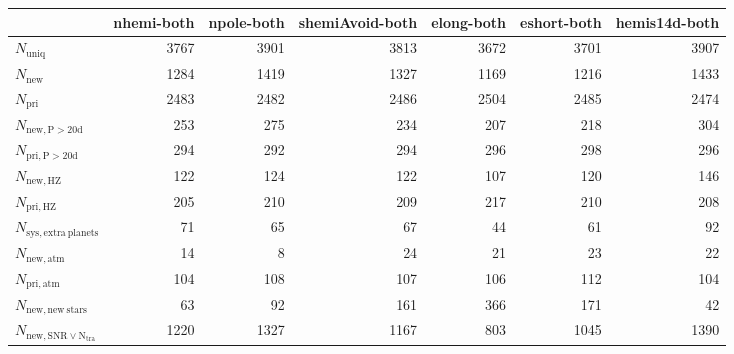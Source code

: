 \begin{tabular}{lrrrrrr}
\toprule
{} &  nhemi-both &  npole-both &  shemiAvoid-both &  elong-both &  eshort-both &  hemis14d-both \\
\midrule
$N_{\mathrm{uniq}}$                &        3767 &        3901 &             3813 &        3672 &         3701 &           3907 \\
$N_{\mathrm{new}}$                 &        1284 &        1419 &             1327 &        1169 &         1216 &           1433 \\
$N_{\mathrm{pri}}$                 &        2483 &        2482 &             2486 &        2504 &         2485 &           2474 \\
$N_{\mathrm{new,P>20d}}$           &         253 &         275 &              234 &         207 &          218 &            304 \\
$N_{\mathrm{pri,P>20d}}$           &         294 &         292 &              294 &         296 &          298 &            296 \\
$N_{\mathrm{new,HZ}}$              &         122 &         124 &              122 &         107 &          120 &            146 \\
$N_{\mathrm{pri,HZ}}$              &         205 &         210 &              209 &         217 &          210 &            208 \\
$N_{\mathrm{sys,extra\ planets}}$  &          71 &          65 &               67 &          44 &           61 &             92 \\
$N_{\mathrm{new,atm}}$             &          14 &           8 &               24 &          21 &           23 &             22 \\
$N_{\mathrm{pri,atm}}$             &         104 &         108 &              107 &         106 &          112 &            104 \\
$N_{\mathrm{new,new\ stars}}$      &          63 &          92 &              161 &         366 &          171 &             42 \\
$N_{\mathrm{new,SNR\lor N_{tra}}}$ &        1220 &        1327 &             1167 &         803 &         1045 &           1390 \\
\bottomrule
\end{tabular}
